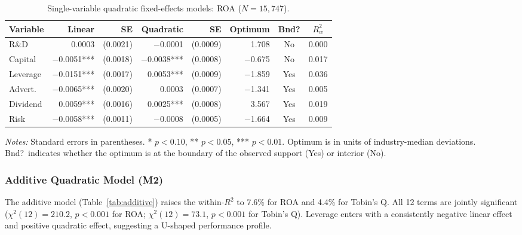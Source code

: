 \documentclass[12pt]{article}
\begin{document}
\begin{table}[htbp]
\centering
\caption{Single-variable quadratic fixed-effects models: ROA ($N = 15{,}747$).}
\label{tab:single_roa}
\begin{tabular}{lrrrrrcc}
\toprule
Variable & Linear & SE & Quadratic & SE & Optimum & Bnd? & $R^2_w$ \\
\midrule
R\&D       &  0.0003       & (0.0021) & $-$0.0001       & (0.0009) &  1.708 & No  & 0.000 \\
Capital    & $-$0.0051***  & (0.0018) & $-$0.0038***    & (0.0008) & $-$0.675 & No  & 0.017 \\
Leverage   & $-$0.0151***  & (0.0017) &    0.0053***    & (0.0009) & $-$1.859 & Yes & 0.036 \\
Advert.    & $-$0.0065***  & (0.0020) &    0.0003       & (0.0007) & $-$1.341 & Yes & 0.005 \\
Dividend   &    0.0059***  & (0.0016) &    0.0025***    & (0.0008) &  3.567 & Yes & 0.019 \\
Risk       & $-$0.0058***  & (0.0011) & $-$0.0008       & (0.0005) & $-$1.664 & Yes & 0.009 \\
\bottomrule
\end{tabular}

\smallskip
\footnotesize\textit{Notes:} Standard errors in parentheses. * $p < 0.10$, ** $p < 0.05$, *** $p < 0.01$. Optimum is in units of industry-median deviations. Bnd?\ indicates whether the optimum is at the boundary of the observed support (Yes) or interior (No).
\end{table}

\subsubsection{Additive Quadratic Model (M2)}

The additive model (Table~\ref{tab:additive}) raises the within-$R^2$ to 7.6\% for ROA and 4.4\% for Tobin's Q. All 12 terms are jointly significant ($\chi^2(12) = 210.2$, $p < 0.001$ for ROA; $\chi^2(12) = 73.1$, $p < 0.001$ for Tobin's Q). Leverage enters with a consistently negative linear effect and positive quadratic effect, suggesting a U-shaped performance profile.
\end{document}
